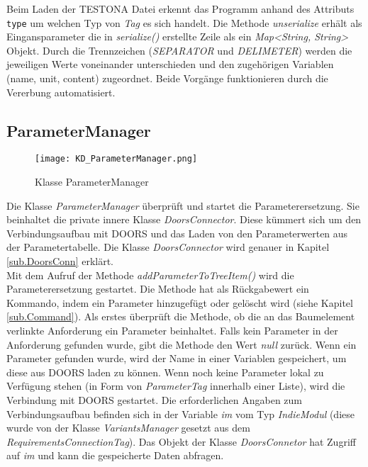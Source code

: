 Beim Laden der TESTONA Datei erkennt das Programm anhand des Attributs \texttt{type} um welchen Typ von \textit{Tag} es sich handelt. Die Methode \textit{unserialize} erhält als Eingansparameter die in \textit{serialize()} erstellte Zeile als ein \textit{Map<String, String>} Objekt. Durch die Trennzeichen (\textit{SEPARATOR} und \textit{DELIMETER}) werden die jeweiligen Werte voneinander unterschieden und den zugehörigen Variablen (name, unit, content) zugeordnet. Beide Vorgänge funktionieren durch die Vererbung automatisiert.

\subsection{ParameterManager}\label{sub:ParameterManager}

\begin{figure}[h]
  \begin{center}
    \texttt{[image: KD\_ParameterManager.png]}
  		  \caption{Klasse ParameterManager}
     \label{kd.ParameterMananger}
  \end{center}
\end{figure}

Die Klasse \textit{ParameterManager} überprüft und startet die Parameterersetzung. Sie beinhaltet die private innere Klasse \textit{DoorsConnector}. Diese kümmert sich um den Verbindungsaufbau mit DOORS und das Laden von den Parameterwerten aus der Parametertabelle. Die Klasse \textit{DoorsConnector} wird genauer in Kapitel \ref{sub.DoorsConn} erklärt.\\


Mit dem Aufruf der Methode \textit{addParameterToTreeItem()} wird die Parameterersetzung gestartet. Die Methode hat als Rückgabewert ein Kommando, indem ein Parameter hinzugefügt oder gelöscht wird (siehe Kapitel \ref{sub.Command}). Als erstes überprüft die Methode, ob die an das Baumelement verlinkte Anforderung ein Parameter beinhaltet. Falls kein Parameter in der Anforderung gefunden wurde, gibt die Methode den Wert \textit{null} zurück. Wenn ein Parameter gefunden wurde, wird der Name in einer Variablen gespeichert, um diese aus DOORS laden zu können. Wenn noch keine Parameter lokal zu Verfügung stehen (in Form von \textit{ParameterTag} innerhalb einer Liste), wird die Verbindung mit DOORS ge\-startet. Die erforderlichen Angaben zum Verbindungsaufbau befinden sich in der Variable \textit{im} vom Typ \textit{IndieModul} (diese wurde von der Klasse \textit{VariantsManager} gesetzt aus dem \textit{RequirementsConnectionTag}). Das Objekt der Klasse \textit{DoorsConnetor} hat Zugriff auf \textit{im} und kann die gespeicherte Daten abfragen.\\


